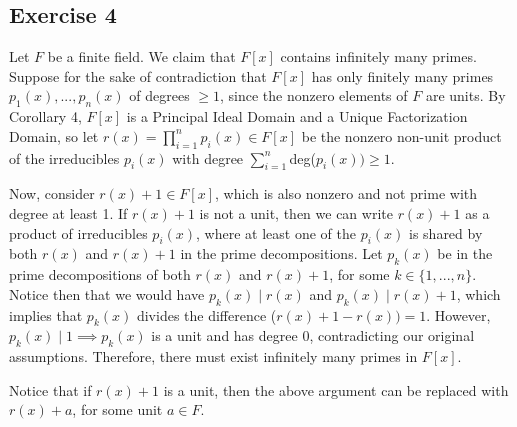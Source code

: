 \subsection*{Exercise 4}
Let $F$ be a finite field. We claim that $F[x]$ contains infinitely many primes. Suppose for the sake of contradiction that $F[x]$ has only finitely many primes $p_1(x), ..., p_n(x)$ of degrees $\ge 1$, since the nonzero elements of $F$ are units. By Corollary 4, $F[x]$ is a Principal Ideal Domain and a Unique Factorization Domain, so let $r(x) = \prod_{i=1}^np_i(x) \in F[x]$ be the nonzero non-unit product of the irreducibles $p_i(x)$ with degree $\sum_{i=1}^n$deg($p_i(x)) \ge 1$.

Now, consider $r(x) + 1 \in F[x]$, which is also nonzero and not prime with degree at least 1. If $r(x)+1$ is not a unit, then we can write $r(x)+1$ as a product of irreducibles $p_i(x)$, where at least one of the $p_i(x)$ is shared by both $r(x)$ and $r(x) + 1$ in the prime decompositions. Let $p_k(x)$ be in the prime decompositions of both $r(x)$ and $r(x) + 1$, for some $k \in \{1,...,n\}$. Notice then that we would have $p_k(x) \mid r(x)$ and $p_k(x) \mid r(x) + 1$, which implies that $p_k(x)$ divides the difference ($r(x) + 1 - r(x)) = 1$. However, $p_k(x) \mid 1 \implies p_k(x)$ is a unit and has degree 0, contradicting our original assumptions. Therefore, there must exist infinitely many primes in $F[x]$.

Notice that if $r(x) + 1$ is a unit, then the above argument can be replaced with $r(x) + a$, for some unit $a \in F$.